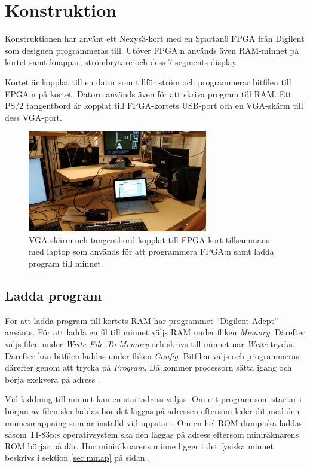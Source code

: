 \documentclass[main.tex]{subfiles}
\begin{document}
\section{Konstruktion}
Konstruktionen har använt ett Nexys3-kort med en Spartan6 FPGA från Digilent
som designen programmeras till. Utöver FPGA:n används även RAM-minnet på kortet
samt knappar, strömbrytare och dess 7-segments-display.

Kortet är kopplat till en dator som tillför ström och programmerar bitfilen
till FPGA:n på kortet. Datorn används även för att skriva program till RAM.
Ett PS/2 tangentbord är kopplat till FPGA-kortets USB-port och en VGA-skärm
till dess VGA-port.  

\begin{figure}
    \centering
    \includegraphics[width=0.7\textwidth,bb=0 0 1152 648]{img/setup_small.jpg}
    \caption{VGA-skärm och tangentbord kopplat till FPGA-kort tillsammans med
    laptop som används för att programmera FPGA:n samt ladda program till
    minnet.}
\end{figure}

\subsection{Ladda program}
För att ladda program till kortets RAM har programmet ``Digilent Adept''
använts. För att ladda en fil till minnet väljs RAM under fliken {\it Memory}.
Därefter väljs filen under {\it Write File To Memory} och skrivs till minnet
när {\it Write} trycks. Därefter kan bitfilen laddas under fliken {\it Config}.
Bitfilen väljs och programmeras därefter genom att trycka på {\it Program}. Då
kommer processorn sätta igång och börja exekvera på adress .

Vid laddning till minnet kan en startadress väljas. Om ett program som startar
i början av filen ska laddas bör det läggas på adressen  eftersom
 leder dit med den minnesmappning som är inställd vid uppstart. Om
en hel ROM-dump ska laddas såsom TI-83p:s operativsystem ska den läggas på
adress  eftersom miniräknarens ROM börjar på där. Hur
miniräknarens minne ligger i det fysiska minnet beskrivs i sektion
\ref{sec:mmap} på sidan \pageref{sec:mmap}.
\end{document}
